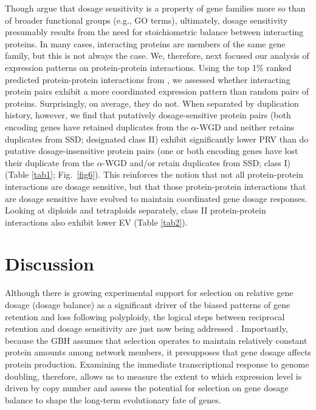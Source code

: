 \documentclass[11pt]{article}
\begin{document}
Though \cite{tasdighian2017} argue that dosage sensitivity is a property of gene families more so than of broader functional groups (e.g., GO terms), ultimately, dosage sensitivity presumably results from the need for stoichiometric balance between interacting proteins. In many cases, interacting proteins are members of the same gene family, but this is not always the case. We, therefore, next focused our analysis of expression patterns on protein-protein interactions. Using the top 1\% ranked predicted protein-protein interactions from \cite{dong2019}, we assessed whether interacting protein pairs exhibit a more coordinated expression pattern than random pairs of proteins. Surprisingly, on average, they do not. When separated by duplication history, however, we find that putatively dosage-sensitive protein pairs (both encoding genes have retained duplicates from the $\alpha$-WGD and neither retains duplicates from SSD; designated class II) exhibit significantly lower PRV than do putative dosage-insensitive protein pairs (one or both encoding genes have lost their duplicate from the $\alpha$-WGD and/or retain duplicates from SSD; class I) (Table \ref{tab1}; Fig.~\ref{fig6}). This reinforces the notion that not all protein-protein interactions are dosage sensitive, but that those protein-protein interactions that are dosage sensitive have evolved to maintain coordinated gene dosage responses. Looking at diploids and tetraploids separately, class II protein-protein interactions also exhibit lower EV (Table \ref{tab2}).

\section*{Discussion}

Although there is growing experimental support for selection on relative gene dosage (dosage balance) as a significant driver of the biased patterns of gene retention and loss following polyploidy, the logical steps between reciprocal retention and dosage sensitivity are just now being addressed \citep{tasdighian2017, coate2016}. Importantly, because the GBH assumes that selection operates to maintain relatively constant protein amounts among network members, it presupposes that gene dosage affects protein production. Examining the immediate transcriptional response to genome doubling, therefore, allows us to measure the extent to which expression level is driven by copy number and assess the potential for selection on gene dosage balance to shape the long-term evolutionary fate of genes.
\end{document}
